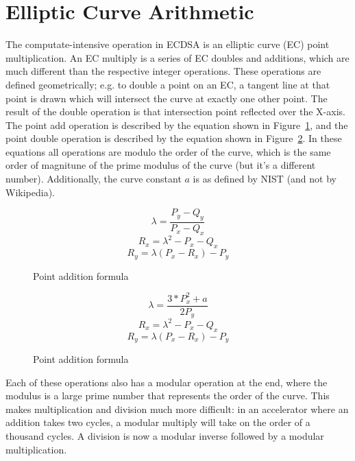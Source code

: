 \documentclass[twocolumn]{article}
\begin{document}
\section{Elliptic Curve Arithmetic}

The computate-intensive operation in ECDSA is an elliptic curve (EC)
point multiplication. An EC multiply is a series of EC doubles and
additions, which are much different than the respective integer
operations. These operations are defined geometrically; e.g. to double
a point on an EC, a tangent line at that point is drawn which will
intersect the curve at exactly one other point. The result of the
double operation is that intersection point reflected over the X-axis.
The point add operation is described by the equation shown in
Figure~\ref{point-add-eq}, and the point double operation is described
by the equation shown in Figure~\ref{point-dub-eq}.  In these
equations all operations are modulo the order of the curve, which is
the same order of magnitune of the prime modulus of the curve (but
it's a different number).  Additionally, the curve constant $a$ is as
defined by NIST (and not by Wikipedia).

\begin{figure}[ht]
  $$ \lambda = \frac{P_y - Q_y}{P_x - Q_x} $$
  $$ R_x = \lambda^2 - P_x - Q_x $$
  $$ R_y = \lambda(P_x - R_x) - P_y $$

  \caption{Point addition formula
    \label{point-add-eq}}
\end{figure}

\begin{figure}[ht]
  $$ \lambda = \frac{3 * P_x^2 + a}{2P_y} $$
  $$ R_x = \lambda^2 - P_x - Q_x $$
  $$ R_y = \lambda(P_x - R_x) - P_y $$

  \caption{Point addition formula
    \label{point-dub-eq}}
\end{figure}

Each of these operations also has a modular operation at the end,
where the modulus is a large prime number that represents the order of
the curve. This makes multiplication and division much more difficult:
in an accelerator where an addition takes two cycles, a modular
multiply will take on the order of a thousand cycles\cite{kss-ecdsa}.
A division is now a modular inverse followed by a modular
multiplication.
\end{document}

